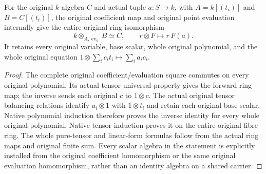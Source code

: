 \begin{lemma}
\label{lem:kn-nadel-bertini-snc-flat-polynomial-evaluation}
\leanok
For the original $k$-algebra $C$ and actual tuple $a:S\to k$, with
$A=k[(t_i)]$ and $B=C[(t_i)]$, the original coefficient map and original
point evaluation internally give the entire original ring isomorphism
\[
 k\otimes_{A,\operatorname{ev}_a}B\simeq C,\qquad
 r\otimes F\longmapsto r\,F(a).
\]
It retains every original variable, base scalar, whole original polynomial,
and the whole original equation
$1\otimes\sum_i c_i t_i\mapsto\sum_i a_i c_i$.
\end{lemma}
\begin{proof}
The complete original coefficient/evaluation square commutes on every
original polynomial.  Its actual tensor universal property gives the
forward ring map; the inverse sends each original $c$ to $1\otimes c$.
The actual original tensor balancing relations identify $a_i\otimes1$
with $1\otimes t_i$ and retain each original base scalar.  Native polynomial
induction therefore proves the inverse identity for every whole original
polynomial.  Native tensor induction proves it on the entire original
fibre ring.  The whole pure-tensor and linear-form formulas follow from
the actual ring maps and original finite sum.  Every scalar algebra in the
statement is explicitly installed from the original coefficient homomorphism
or the same original evaluation homomorphism, rather than an identity
algebra on a shared carrier.
\end{proof}

